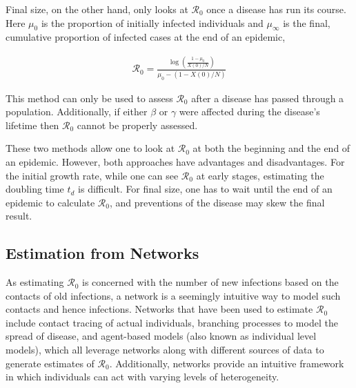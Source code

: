 \documentclass[12pt]{article}
\newcommand{\rr}{\ensuremath{\mathcal{R}_0}}
\begin{document}
  Final size, on the other hand, only looks at $\rr$ once a disease has run its course.  Here $\mu_0$ is the proportion of initially infected individuals and $\mu_\infty$ is the final, cumulative proportion of infected cases at the end of an epidemic,

\begin{align}\label{r0_attackrate}
\rr =  \frac{\log \left (\frac{1  - \mu_0}{X(0)/N}  \right ) }{\mu_0 - (1 - X(0)/N)}
\end{align}

This method can only be used to assess $\rr$ after a disease has passed through a population.  Additionally, if either $\beta$ or $\gamma$ were affected during the disease's lifetime then $\rr$ cannot be properly assessed.

  These two methods allow one to look at $\rr$ at both the beginning and the end of an epidemic.  However, both approaches have advantages and disadvantages.  For the initial growth rate, while one can see $\rr$ at early stages, estimating the doubling time $t_d$ is difficult.  For final size, one has to wait until the end of an epidemic to calculate $\rr$, and preventions of the disease may skew the final result.

  \subsection{Estimation from Networks}
As estimating $\rr$ is concerned with the number of new infections based on the contacts of old infections, a network is a seemingly intuitive way to model such contacts and hence infections.  Networks that have been used to estimate $\rr$ include contact tracing of actual individuals, branching processes to model the spread of disease, and agent-based models (also known as individual level models), which all leverage networks along with different sources of data to generate estimates of $\rr$.  Additionally, networks provide an intuitive framework in which individuals can act with varying levels of heterogeneity.
  
\label{sec:network}

\end{document}
